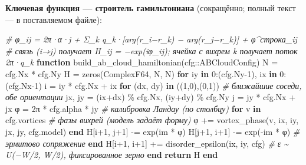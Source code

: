 \documentclass[
]{article}
\newenvironment{Shaded}{}{}
\newcommand{\CommentTok}[1]{\textcolor[rgb]{0.38,0.63,0.69}{\textit{#1}}}
\newcommand{\ConstantTok}[1]{\textcolor[rgb]{0.53,0.00,0.00}{#1}}
\newcommand{\ControlFlowTok}[1]{\textcolor[rgb]{0.00,0.44,0.13}{\textbf{#1}}}
\newcommand{\DataTypeTok}[1]{\textcolor[rgb]{0.56,0.13,0.00}{#1}}
\newcommand{\FloatTok}[1]{\textcolor[rgb]{0.25,0.63,0.44}{#1}}
\newcommand{\FunctionTok}[1]{\textcolor[rgb]{0.02,0.16,0.49}{#1}}
\newcommand{\KeywordTok}[1]{\textcolor[rgb]{0.00,0.44,0.13}{\textbf{#1}}}
\newcommand{\NormalTok}[1]{#1}
\newcommand{\OperatorTok}[1]{\textcolor[rgb]{0.40,0.40,0.40}{#1}}
\begin{document}
\textbf{Ключевая функция --- строитель гамильтониана} (сокращённо;
полный текст --- в поставляемом файле):

\begin{Shaded}
\begin{Highlighting}[]
\CommentTok{\# φ\_ij = 2π·α·j + Σ\_k q\_k·[arg(r\_i−r\_k) − arg(r\_j−r\_k)] + φ\^{}строка\_ij}
\CommentTok{\# связь (i→j) получает H\_ij = −exp(iφ\_ij); ячейка с вихрем k получает поток 2π·q\_k}
\KeywordTok{function} \FunctionTok{build\_ab\_cloud\_hamiltonian}\NormalTok{(cfg}\OperatorTok{::}\DataTypeTok{ABCloudConfig}\NormalTok{)}
\NormalTok{    N }\OperatorTok{=}\NormalTok{ cfg.Nx }\OperatorTok{*}\NormalTok{ cfg.Ny}
\NormalTok{    H }\OperatorTok{=} \FunctionTok{zeros}\NormalTok{(}\DataTypeTok{ComplexF64}\NormalTok{, N, N)}
    \ControlFlowTok{for}\NormalTok{ iy }\KeywordTok{in} \FloatTok{0}\OperatorTok{:}\NormalTok{(cfg.Ny}\OperatorTok{{-}}\FloatTok{1}\NormalTok{), ix }\KeywordTok{in} \FloatTok{0}\OperatorTok{:}\NormalTok{(cfg.Nx}\OperatorTok{{-}}\FloatTok{1}\NormalTok{)}
\NormalTok{        i }\OperatorTok{=}\NormalTok{ iy }\OperatorTok{*}\NormalTok{ cfg.Nx }\OperatorTok{+}\NormalTok{ ix}
        \ControlFlowTok{for}\NormalTok{ (dx, dy) }\KeywordTok{in}\NormalTok{ ((}\FloatTok{1}\NormalTok{,}\FloatTok{0}\NormalTok{),(}\FloatTok{0}\NormalTok{,}\FloatTok{1}\NormalTok{))            }\CommentTok{\# ближайшие соседи, обе ориентации}
\NormalTok{            jx, jy }\OperatorTok{=}\NormalTok{ (ix}\OperatorTok{+}\NormalTok{dx) }\OperatorTok{\%}\NormalTok{ cfg.Nx, (iy}\OperatorTok{+}\NormalTok{dy) }\OperatorTok{\%}\NormalTok{ cfg.Ny}
\NormalTok{            j }\OperatorTok{=}\NormalTok{ jy }\OperatorTok{*}\NormalTok{ cfg.Nx }\OperatorTok{+}\NormalTok{ jx}
            \ConstantTok{φ} \OperatorTok{=} \FloatTok{2}\NormalTok{π }\OperatorTok{*}\NormalTok{ cfg.alpha }\OperatorTok{*}\NormalTok{ jy              }\CommentTok{\# калибровка Ландау (по столбцу)}
            \ControlFlowTok{for}\NormalTok{ v }\KeywordTok{in}\NormalTok{ cfg.vortices                }\CommentTok{\# фазы вихрей (модель задаёт форму)}
                \ConstantTok{φ} \OperatorTok{+=} \FunctionTok{vortex\_phase}\NormalTok{(v, ix, iy, jx, jy, cfg.model)}
            \ControlFlowTok{end}
\NormalTok{            H[i}\OperatorTok{+}\FloatTok{1}\NormalTok{, j}\OperatorTok{+}\FloatTok{1}\NormalTok{] }\OperatorTok{{-}=} \FunctionTok{exp}\NormalTok{(}\ConstantTok{im} \OperatorTok{*} \ConstantTok{φ}\NormalTok{)}
\NormalTok{            H[j}\OperatorTok{+}\FloatTok{1}\NormalTok{, i}\OperatorTok{+}\FloatTok{1}\NormalTok{] }\OperatorTok{{-}=} \FunctionTok{exp}\NormalTok{(}\OperatorTok{{-}}\ConstantTok{im} \OperatorTok{*} \ConstantTok{φ}\NormalTok{)          }\CommentTok{\# эрмитово сопряжение}
        \ControlFlowTok{end}
\NormalTok{        H[i}\OperatorTok{+}\FloatTok{1}\NormalTok{, i}\OperatorTok{+}\FloatTok{1}\NormalTok{] }\OperatorTok{+=} \FunctionTok{disorder\_epsilon}\NormalTok{(ix, iy, cfg)   }\CommentTok{\# ε \textasciitilde{} U(−W/2, W/2), фиксированное зерно}
    \ControlFlowTok{end}
    \ControlFlowTok{return}\NormalTok{ H}
\KeywordTok{end}
\end{Highlighting}
\end{Shaded}
\end{document}
